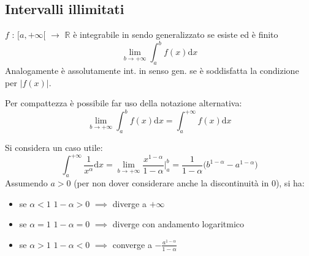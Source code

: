 \documentclass[10pt, oneside]{book}
\theoremstyle{plain}
\begin{document}
\subsection{Intervalli illimitati}
\begin{defin}
    $f$ : $[a,+\infty[$ $\rightarrow$ $\mathbb{R}$ è integrabile in sendo generalizzato se esiste ed è finito
    \[\lim\limits_{b \rightarrow +\infty} \int_{a}^{b} f(x)\textrm{d}x\]
    Analogamente è assolutamente int. in senso gen. se è soddisfatta la condizione per $|f(x)|$.
\end{defin}
\begin{oss}
    Per compattezza è possibile far uso della notazione alternativa:
    \[\lim\limits_{b \rightarrow +\infty} \int_{a}^{b} f(x)\textrm{d}x = \int_{a}^{+\infty} f(x)\textrm{d}x\]
\end{oss}
Si considera un caso utile:
\[\int_{a}^{+\infty} \frac{1}{x^\alpha}\textrm{d}x = \lim\limits_{b \rightarrow +\infty} \frac{x^{1-\alpha}}{1 - \alpha}\bigg|_a^b = \frac{1}{1-\alpha}\big(b^{1-\alpha} - a^{1-\alpha}\big)\]
Assumendo $a > 0$ (per non dover considerare anche la discontinuità in $0$), si ha:
\begin{itemize}
    \item se $\alpha < 1$ $1 - \alpha > 0$ $\implies$ diverge a $+\infty$
    \item se $\alpha = 1$ $1 - \alpha = 0$ $\implies$ diverge con andamento logaritmico
    \item se $\alpha > 1$ $1 - \alpha < 0$ $\implies$ converge a $-\frac{a^{1-\alpha}}{1-\alpha}$
\end{itemize}
\end{document}
